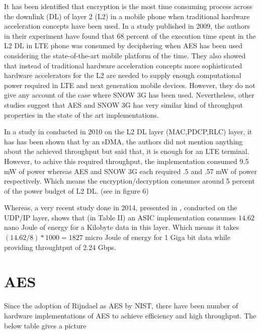 \documentclass[12pt]{article}
\begin{document}
It has been identified that encryption is the most time consuming process across the downlink (DL) of layer 2 (L2) in a mobile phone when traditional hardware acceleration concepts have been used. In a study \cite{IIS_Ruhr_2009} published in 2009, the authors in their experiment have found that 68 percent of the execution time spent in the L2 DL in LTE phone was consumed by deciphering when AES has been used considering the state-of-the-art mobile platform of the time. They also showed that instead of traditional hardware acceleration concepts more sophisticated hardware accelerators for the L2 are needed to supply enough computational power required in LTE and next generation mobile devices. However, they do not give any account of the case where SNOW 3G has been used. Nevertheless, other studies suggest that AES and SNOW 3G has very similar kind of throughput properties in the state of the art implementations.

\pagebreak

In a study in \cite{IIS_Ruhr_2010} conducted in 2010 on the L2 DL layer (MAC,PDCP,RLC) layer, it has has been shown that by an sDMA, the authors did not mention anything about the achieved throughput but said that, it is enough for an LTE terminal. However, to achive this required throughput, the implementation consumed 9.5 mW of power whereas AES and SNOW 3G each required .5 and .57 mW of power respectively. Which means the encryption/decryption consumes around 5 percent of the power budget of L2 DL. (see in figure 6)

Whereas, a very recent study done in 2014, presented in \cite{KTH_2014}, conducted on the UDP/IP layer, shows that (in Table II) an ASIC implementation consumes $14.62$ nano Joule of energy for a Kilobyte data in this layer. Which means it takes $(14.62/8)*1000 = 1827$ micro Joule of energy for 1 Giga bit data while providing throughtput of 2.24 Gbps.

\section{AES}

Since the adoption of Rijndael as AES by NIST, there have been number of hardware implementations of AES to achieve efficiency and high throughput. The below table gives a picture \newline
\end{document}
